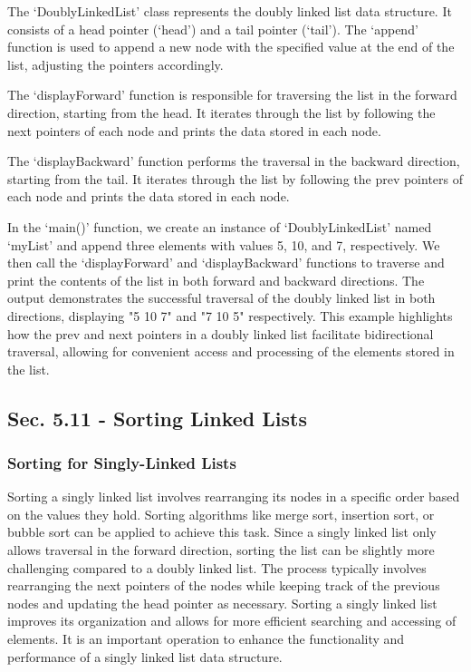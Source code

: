 \begin{solution}
    The `DoublyLinkedList' class represents the doubly linked list data structure. It consists of a head pointer (`head') and a tail pointer (`tail'). The `append' function is used to append a new node with the specified value at the end of the list, adjusting the pointers accordingly.

    The `displayForward' function is responsible for traversing the list in the forward direction, starting from the head. It iterates through the list by following the next pointers of each node and prints the data stored in each node.

    The `displayBackward' function performs the traversal in the backward direction, starting from the tail. It iterates through the list by following the prev pointers of each node and prints the data stored in each node.

    In the `main()' function, we create an instance of `DoublyLinkedList' named `myList' and append three elements with values 5, 10, and 7, respectively. We then call the `displayForward' and `displayBackward' functions to traverse and print the contents of the list in both forward and backward directions. The output demonstrates 
    the successful traversal of the doubly linked list in both directions, displaying "5 10 7" and "7 10 5" respectively. This example highlights how the prev and next pointers in a doubly linked list facilitate bidirectional traversal, allowing for convenient access and processing of the elements stored in the list.
\end{solution}

\subsection*{Sec. 5.11 - Sorting Linked Lists}

\subsubsection{Sorting for Singly-Linked Lists}

Sorting a singly linked list involves rearranging its nodes in a specific order based on the values they hold. Sorting algorithms like merge sort, insertion sort, or bubble sort can be applied to achieve this task. Since a singly linked list only allows traversal in the forward direction, sorting the list can be slightly more challenging 
compared to a doubly linked list. The process typically involves rearranging the next pointers of the nodes while keeping track of the previous nodes and updating the head pointer as necessary. Sorting a singly linked list improves its organization and allows for more efficient searching and accessing of elements. It is an important operation 
to enhance the functionality and performance of a singly linked list data structure.

